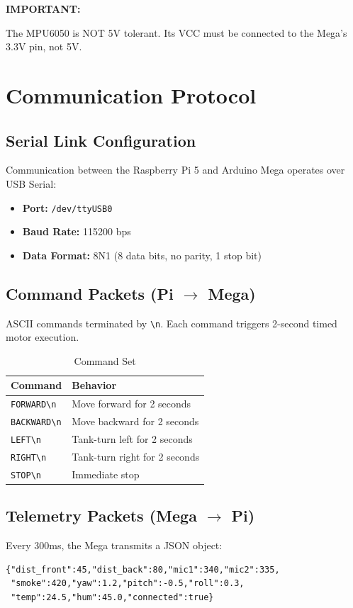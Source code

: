 \documentclass[11pt,a4paper]{article}
\newenvironment{important}[1][IMPORTANT]{%
    \medskip\noindent\color{firerose}\textbf{#1:}\color{black}\ \begin{itshape}%
}{\end{itshape}\medskip}
\begin{document}
\begin{important}
The MPU6050 is NOT 5V tolerant. Its VCC must be connected to the Mega's 3.3V pin, not 5V.
\end{important}

\section{Communication Protocol}

\subsection{Serial Link Configuration}
Communication between the Raspberry Pi 5 and Arduino Mega operates over USB Serial:
\begin{itemize}
    \item \textbf{Port:} \texttt{/dev/ttyUSB0}
    \item \textbf{Baud Rate:} 115200 bps
    \item \textbf{Data Format:} 8N1 (8 data bits, no parity, 1 stop bit)
\end{itemize}

\subsection{Command Packets (Pi $\rightarrow$ Mega)}
ASCII commands terminated by \texttt{\textbackslash n}. Each command triggers 2-second timed motor execution.

\begin{table}[h]
\centering
\caption{Command Set}
\begin{tabularx}{\textwidth}{l X}
\toprule
\textbf{Command} & \textbf{Behavior} \\
\midrule
\texttt{FORWARD\textbackslash n} & Move forward for 2 seconds \\
\texttt{BACKWARD\textbackslash n} & Move backward for 2 seconds \\
\texttt{LEFT\textbackslash n} & Tank-turn left for 2 seconds \\
\texttt{RIGHT\textbackslash n} & Tank-turn right for 2 seconds \\
\texttt{STOP\textbackslash n} & Immediate stop \\
\bottomrule
\end{tabularx}
\end{table}

\subsection{Telemetry Packets (Mega $\rightarrow$ Pi)}
Every 300ms, the Mega transmits a JSON object:
\begin{verbatim}
{"dist_front":45,"dist_back":80,"mic1":340,"mic2":335,
 "smoke":420,"yaw":1.2,"pitch":-0.5,"roll":0.3,
 "temp":24.5,"hum":45.0,"connected":true}
\end{verbatim}
\end{document}
